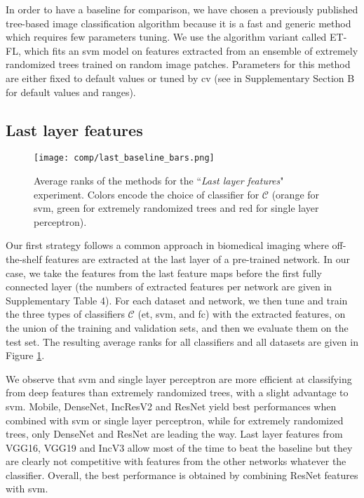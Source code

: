 In order to have a baseline for comparison, we have chosen a previously published tree-based image classification algorithm \parencite{maree2016towards} because it is a fast and generic method which requires few parameters tuning. We use the algorithm variant called ET-FL, which fits an \acrshort{svm} model on features extracted from an ensemble of extremely randomized trees trained on random image patches. Parameters for this method are either fixed to default values or tuned by \acrlong{cv} (see in Supplementary Section B for default values and ranges).



 
  
  
\subsection{Last layer features}
\label{ssec:comp:exp_last_layer}


 \begin{figure}
     \center
     \texttt{[image: comp/last\_baseline\_bars.png]}
     \caption{Average ranks of the methods for the ``\textit{Last layer features}" experiment. Colors encode the choice of classifier for $\mathcal{C}$ (orange for \acrshort{svm}, green for extremely randomized trees and red for single layer perceptron).}
     \label{fig:comp:avg_ranks_last_layer}
 \end{figure}

Our first strategy follows a common approach in biomedical imaging where off-the-shelf features are extracted at the last layer of a pre-trained network. In our case, we take the features from the last feature maps before the first fully connected layer (the numbers of extracted features per network are given in Supplementary Table 4). For each dataset and network, we then tune and train the three types of classifiers $\mathcal{C}$ (\acrshort{et}, \acrshort{svm}, and \acrshort{fc}) with the extracted features, on the union of the training and validation sets, and then we evaluate them on the test set. The resulting average ranks for all classifiers and all datasets are given in Figure \ref{fig:comp:avg_ranks_last_layer}.

We observe that \acrshort{svm} and single layer perceptron are more efficient at classifying from deep features than extremely randomized trees, with a slight advantage to \acrshort{svm}. Mobile, DenseNet, IncResV2 and ResNet yield best performances when combined with \acrshort{svm} or single layer perceptron, while for extremely randomized trees, only DenseNet and ResNet are leading the way. Last layer features from VGG16, VGG19 and IncV3 allow most of the time to beat the baseline but they are clearly not competitive with features from the other networks whatever the classifier. Overall, the best performance is obtained by combining ResNet features with \acrshort{svm}.




